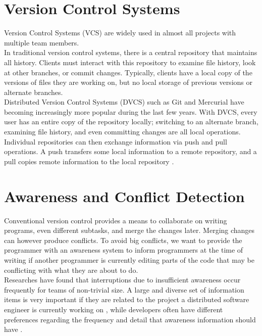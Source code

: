 \section{Version Control Systems}


Version Control Systems (VCS) are widely used in almost all projects with multiple team members. \\

In traditional version control systems, there is a central repository that maintains all history. Clients must interact with this repository to examine file history, look at other branches, or commit changes. Typically, clients have a local copy of the versions of files they are working on, but no local storage of previous versions or alternate branches. \\

Distributed Version Control Systems (DVCS) such as Git and Mercurial have becoming increasingly more popular during the last few years. With DVCS, every user has an entire copy of the repository locally; switching to an alternate branch, examining file history, and even committing changes are all local operations. Individual repositories can then exchange information via push and pull operations. A push transfers some local information to a remote repository, and a pull copies remote information to the local repository \cite{ref17}.




\section{Awareness and Conflict Detection}





Conventional version control provides a means to collaborate on writing programs, even different subtasks, and merge the changes later. Merging changes can however produce conflicts. To avoid big conflicts, we want to provide the programmer with an awareness system to inform programmers at the time of writing if another programmer is currently editing parts of the code that may be conflicting with what they are about to do. \\

Researches have found that interruptions due to insufficient awareness occur frequently for teams of non-trivial size. A large and diverse set of information items is very important if they are related to the project a distributed software engineer is currently working on \cite{ref21}, while developers often have different preferences regarding the frequency and detail that awareness information should have \cite{ref3}. 




